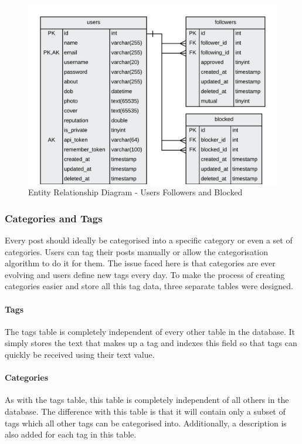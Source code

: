 \begin{figure}[H]
  \centering
  \includegraphics[width=1.0\textwidth]{Images/Design/Database/Followers}
  \caption{Entity Relationship Diagram - Users Followers and Blocked} \label{fig:ERD_Followers}
\end{figure}

\subsubsection{Categories and Tags}
Every post should ideally be categorised into a specific category or even a set of categories. Users can tag their posts manually or allow the categorisation algorithm to do it for them. The issue faced here is that categories are ever evolving and users define new tags every day. To make the process of creating categories easier and store all this tag data, three separate tables were designed. 

\paragraph{Tags}
The tags table is completely independent of every other table in the database. It simply stores the text that makes up a tag and indexes this field so that tags can quickly be received using their text value.

\paragraph{Categories}
As with the tags table, this table is completely independent of all others in the database. The difference with this table is that it will contain only a subset of tags which all other tags can be categorised into. Additionally, a description is also added for each tag in this table.

